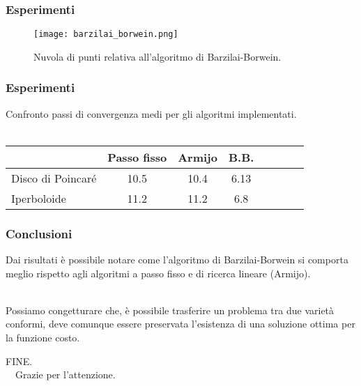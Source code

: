 \documentclass{beamer}
\begin{document}
\begin{frame}
\frametitle{Esperimenti}
\begin{figure}[H]
    \texttt{[image: barzilai\_borwein.png]}
    \caption{Nuvola di punti relativa all’algoritmo di Barzilai-Borwein.}
\end{figure}
\end{frame}

\begin{frame}
\frametitle{Esperimenti}
Confronto passi di convergenza medi per gli algoritmi implementati.\\~\
\begin{center}
\begin{tabular}{l*{6}{c}r}
                    & Passo fisso & Armijo & B.B. \\
\hline
Disco di Poincaré   & 10.5 & 10.4 & 6.13 \\
Iperboloide         & 11.2 & 11.2 & 6.8 \\
\end{tabular}
\end{center}
\end{frame}

\begin{frame}
\frametitle{Conclusioni}
Dai risultati è possibile notare come l’algoritmo di Barzilai-Borwein si comporta meglio rispetto agli algoritmi a passo fisso e di ricerca lineare (Armijo).\\~\

Possiamo congetturare che, è possibile trasferire un problema tra due varietà  conformi, deve comunque essere preservata l’esistenza di una soluzione ottima per la funzione costo.
\end{frame}

\begin{frame}
\begin{center}
FINE.\\~\
Grazie per l'attenzione.
\end{center}
\end{frame}
\end{document}
